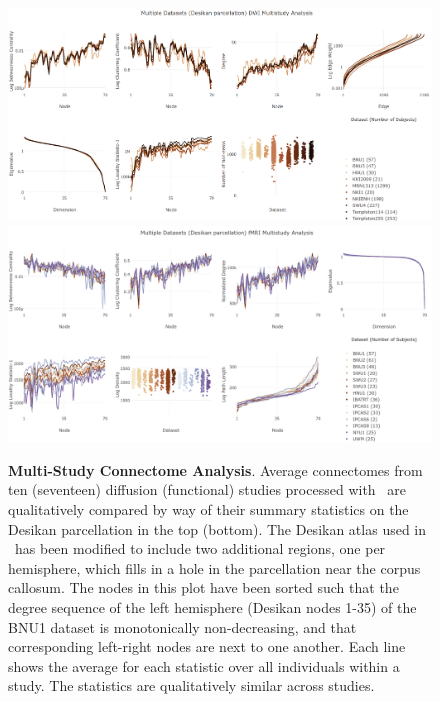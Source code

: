 \documentclass[11pt]{article}
\begin{document}
\begin{multicols}{2}
\begin{figure}[t!]
    \centering
    \includegraphics[width=\textwidth]{./figs/fig_dwi_multisite.png}
    \includegraphics[width=\textwidth]{./figs/fig_fmri_multisite.png}
    \caption{
    \textbf{Multi-Study Connectome Analysis}.
    Average connectomes from ten (seventeen) diffusion (functional) studies processed with \ndmgd~are qualitatively compared by way of their summary statistics on the Desikan parcellation in the top (bottom).
    The Desikan atlas used in \ndmg~has been modified to include two additional regions, one per hemisphere, which fills in a hole in the parcellation near the corpus callosum.
    The nodes in this plot have been sorted such that the degree sequence of the left hemisphere (Desikan nodes 1-35) of the BNU1 dataset is monotonically non-decreasing, and that corresponding left-right nodes are next to one another.
    Each line shows the average for each statistic over all individuals within a study.
    The statistics are  qualitatively similar across studies. 
    }
    \label{fig:multisite}
\end{figure}



\end{multicols}
\end{document}
